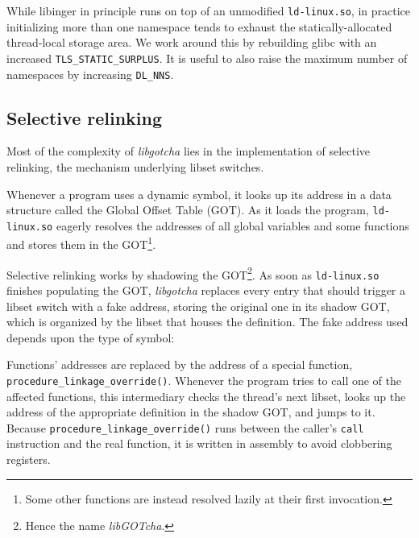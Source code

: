 
While libinger in principle runs on top of an unmodified \texttt{ld-linux.so}, in
practice initializing more than one namespace tends to exhaust the
statically-allocated thread-local storage area.  We work around this by rebuilding
glibc with an increased \texttt{TLS\_STATIC\_SURPLUS}.  It is useful to also raise
the maximum number of namespaces by increasing \texttt{DL\_NNS}.


\subsection{Selective relinking}

Most of the complexity of \textit{libgotcha} lies in the implementation of selective
relinking, the mechanism underlying libset switches.

Whenever a program uses a dynamic symbol, it looks up its address in a data structure
called the Global Offset Table (GOT).  As it loads the program, \texttt{ld-linux.so}
eagerly resolves the addresses of all global variables and some functions and stores
them in the GOT\footnote{Some other functions are instead resolved lazily at their
first invocation.}.

Selective relinking works by shadowing the GOT\footnote{Hence the name
\textit{libGOTcha}.}.  As soon as \texttt{ld-linux.so} finishes populating
the GOT, \textit{libgotcha} replaces every entry that should trigger a libset switch
with a fake address, storing the original one in its shadow GOT, which is organized
by the libset that houses the definition.  The fake address used depends upon the
type of symbol:


Functions' addresses are replaced by the address of a special function,
\texttt{procedure\_linkage\_override()}.  Whenever the program tries to call one of
the affected functions, this intermediary checks the thread's next libset, looks up
the address of the appropriate definition in the shadow GOT, and jumps to it.
Because \texttt{procedure\_linkage\_override()} runs between the caller's
\texttt{call} instruction and the real function, it is written in assembly to avoid
clobbering registers.


